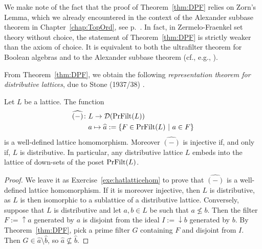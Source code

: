 We make note of the fact that the proof of Theorem~\ref{thm:DPF} relies on Zorn's Lemma, which we already encountered in the context of the Alexander subbase theorem in Chapter~\ref{chap:TopOrd}, see p.~\pageref{lem:zorn}. In fact, in Zermelo-Fraenkel set theory without choice, the statement of Theorem~\ref{thm:DPF} is strictly weaker than the axiom of choice. It is equivalent to both the ultrafilter theorem for Boolean algebras and to the Alexander subbase theorem (cf., e.g., \cite{How1998}).

From Theorem~\ref{thm:DPF}, we obtain the following \emph{representation theorem for distributive lattices}, due to Stone (1937/38) \cite{Sto1937/38}.
\begin{theorem}\label{thm:DLrep}
Let $L$ be a lattice. The function
\begin{align*}
\widehat{(-)} \colon &L \to \mathcal{D}(\mathrm{PrFilt}(L)) \\
&a \mapsto \widehat{a} := \{F \in \mathrm{PrFilt}(L) \ | \ a \in F\}
\end{align*}
is a well-defined lattice homomorphism. Moreover $\widehat{(-)}$ is injective if, and only if, $L$ is distributive. In particular, any distributive lattice $L$ embeds into the lattice of down-sets of the poset $\mathrm{PrFilt}(L)$.
\end{theorem}
\begin{proof}
We leave it as Exercise~\ref{exe:hatlatticehom} to prove that $\widehat{(-)}$ is a well-defined lattice homomorphism. If it is moreover injective, then $L$ is distributive, as $L$ is then isomorphic to a sublattice of a distributive lattice. Conversely, suppose that $L$ is distributive and let $a, b \in L$ be such that $a \nleq b$. Then the filter $F := {\uparrow}a$ generated by $a$ is disjoint from the ideal $I := {\downarrow}b$ generated by $b$. By Theorem~\ref{thm:DPF}, pick a prime filter $G$ containing $F$ and disjoint from $I$. Then $G \in \widehat{a} \setminus \widehat{b}$, so $\widehat{a} \not\subseteq \widehat{b}$.
\end{proof}
